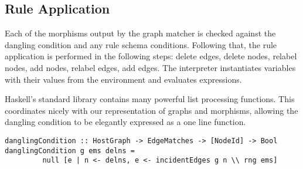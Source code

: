 \begin{comment} A sample of the edge matching code is given below.

\begin{verbatim}
1 ruleEdges = allEdges r
2 ruleEndPoints = map (\e -> (e, source r e, target r e)) ruleEdges
3 hostEndPoints = map ruleEndsToHostEnds ruleEndPoints
4 hostEdges = map getCandidateEdges hostEndPoints
\end{verbatim}

Line 1 creates the list of all edge identifiers of the rule graph. Line 2 maps over this list to get the list of source-target pairs for each edge. Line 3 uses an auxiliary function to generate the corresponding pairs in the host graph. \texttt{ruleEndsToHostEnds} takes a triple $(e, s, t)$ of a rule edge, its source and its target, and uses the node morphism to output $(e, s', t')$, where $s'$ and $t'$ are the images in the node mapping of $s'$ and $t'$ respectively. Finally, line 4 uses a second auxiliary function to find the appropriate edge for each pair of host nodes generated in the previous line. \texttt{getCandidateEdges} calls a function \texttt{joiningEdges} (from the \texttt{Graph} module) on each node pair $(s, t)$ to get the list of all edges in the host graph from $s$ to $t$. 

The morphisms generated obey the morphism conditions by construction. Furthermore, all output morphisms are total. A quick scan of the code can verify this. For instance, the frequently used \texttt{map} preserves list size, so it immediately follows that in the code fragment above, \texttt{hostEdges} is a list of equal length to \texttt{ruleEdges}. 
\end{comment}

\subsection{Rule Application}

Each of the morphisms output by the graph matcher is checked against the dangling condition and any rule schema conditions. Following that, the rule application is performed in the following steps: delete edges, delete nodes, relabel nodes, add nodes, relabel edges, add edges. The interpreter instantiates variables with their values from the environment and evaluates expressions.

Haskell's standard library contains many powerful list processing functions. This coordinates nicely with our representation of graphs and morphisms, allowing the dangling condition to be elegantly expressed as a one line function.
\begin{verbatim}
danglingCondition :: HostGraph -> EdgeMatches -> [NodeId] -> Bool
danglingCondition g ems delns = 
         null [e | n <- delns, e <- incidentEdges g n \\ rng ems]
\end{verbatim}

